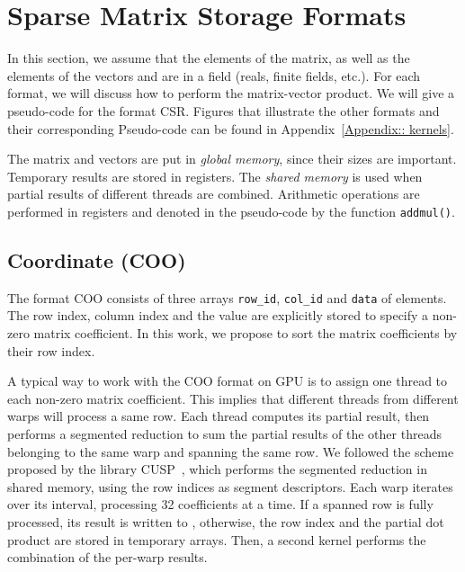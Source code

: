 \documentclass[runningheads,orivec]{llncs}
\begin{document}
\vspace*{-0.5cm}
\section{Sparse Matrix Storage Formats}

In this section, we assume that the elements of the matrix, as well as the elements of the vectors  and  are in a field  (reals, finite fields, etc.). For each format, we will discuss how to perform the matrix-vector product. We will give a pseudo-code for the format CSR. Figures that illustrate the other formats and their corresponding Pseudo-code can be found in Appendix~\ref{Appendix:: kernels}.

The matrix and vectors are put in \textit{global memory}, since their sizes are important. Temporary results are stored in registers. The \textit{shared memory} is used when partial results of different threads are combined. Arithmetic operations are performed in registers and denoted in the pseudo-code by the function \texttt{addmul()}.


\label{SpM formats}

\vspace*{-0.25cm}
\subsection*{Coordinate (COO)}
\vspace*{-0.25cm}

The format COO consists of three arrays \texttt{row\_id}, \texttt{col\_id} and \texttt{data} of  elements. The row index, column index and the value are explicitly stored to specify a non-zero matrix coefficient. In this work, we propose to sort the matrix coefficients by their row index.







A typical way to work with the COO format on GPU is to assign one thread to each non-zero matrix coefficient. This implies that different threads from different warps will process a same row. Each thread computes its partial result, then performs a segmented reduction \cite{BLEL93,SENG07} to sum the partial results of the other threads belonging to the same warp and spanning the same row. We followed the scheme proposed by the library CUSP~\cite{CUSP}, which performs the segmented reduction in shared memory, using the row indices as segment descriptors. Each warp iterates over its interval, processing 32 coefficients at a time. If a spanned row is fully processed, its result is written to , otherwise, the row index and the partial dot product are stored in temporary arrays. Then, a second kernel performs the combination of the per-warp results.
\end{document}
